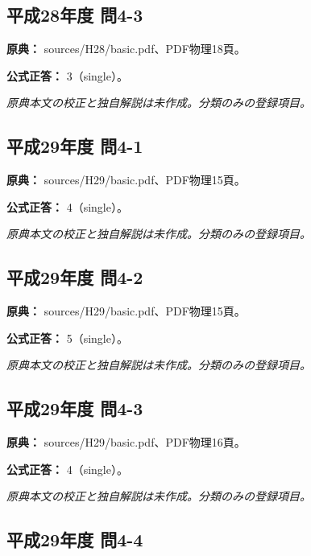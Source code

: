 \subsection{平成28年度 問4-3}
\label{q:h28-reg-basic-4-3}

\noindent\textbf{原典：} sources/H28/basic.pdf、PDF物理18頁。

\textbf{公式正答：} 3（single）。

\par\textit{原典本文の校正と独自解説は未作成。分類のみの登録項目。}

\subsection{平成29年度 問4-1}
\label{q:h29-reg-basic-4-1}

\noindent\textbf{原典：} sources/H29/basic.pdf、PDF物理15頁。

\textbf{公式正答：} 4（single）。

\par\textit{原典本文の校正と独自解説は未作成。分類のみの登録項目。}

\subsection{平成29年度 問4-2}
\label{q:h29-reg-basic-4-2}

\noindent\textbf{原典：} sources/H29/basic.pdf、PDF物理15頁。

\textbf{公式正答：} 5（single）。

\par\textit{原典本文の校正と独自解説は未作成。分類のみの登録項目。}

\subsection{平成29年度 問4-3}
\label{q:h29-reg-basic-4-3}

\noindent\textbf{原典：} sources/H29/basic.pdf、PDF物理16頁。

\textbf{公式正答：} 4（single）。

\par\textit{原典本文の校正と独自解説は未作成。分類のみの登録項目。}

\subsection{平成29年度 問4-4}
\label{q:h29-reg-basic-4-4}


